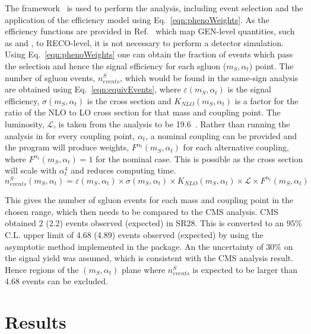 The \MADAN framework~\cite{Conte2013222} is used to perform the analysis, including event selection and the application of the efficiency model using Eq.~\ref{eqn:phenoWeights}. As the efficiency functions are provided in Ref.~\cite{Chatrchyan:2013fea} which map GEN-level quantities, such as \HT and \MET, to RECO-level, it is not necessary to perform a detector simulation.
Using Eq.~\ref{eqn:phenoWeights} one can obtain the fraction of events which pass the selection and hence the signal efficiency for each sgluon ($m_{S},\alpha_{t}$) point. The number of sgluon events, $n^{S}_{events}$, which would be found in the same-sign analysis are obtained using Eq.~\ref{eqn:equivEvents}, where $\varepsilon\left(m_{S},\alpha_{t}\right)$ is the signal efficiency, $\sigma\left(m_{S},\alpha_{t}\right)$ is the cross section and $K_{NLO}\left(m_{S},\alpha_{t}\right)$ is a factor for the ratio of the NLO to LO cross section for that mass and coupling point. The luminosity, $\mathcal{L}$, is taken from the analysis to be 19.6~\fbinv. Rather than running the analysis in \MADAN for every coupling point, $\alpha_{t}$, a nominal coupling can be provided and the program will produce weights, $F^{\alpha_{t}}\left(m_{S},\alpha_{t}\right)$ for each alternative coupling, where $F^{\alpha_{t}}\left(m_{S},\alpha_{t}\right) = 1$ for the nominal case. This is possible as the cross section will scale with $\alpha_{t}^{4}$ and reduces computing time.
\begin{equation}
n^{S}_{events}\left(m_{S},\alpha_{t}\right) = \varepsilon\left(m_{S},\alpha_{t}\right)\times \sigma\left(m_{S},\alpha_{t}\right) \times K_{NLO}\left(m_{S},\alpha_{t}\right) \times \mathcal{L}\times F^{\alpha_{t}}\left(m_{S},\alpha_{t}\right)
\label{eqn:equivEvents}
\end{equation}

This gives the number of sgluon events for each mass and coupling point in the chosen range, which then needs to be compared to the CMS analysis. CMS obtained 2 (2.2) events observed (expected) in SR28. This is converted to an $95\%$ C.L. upper limit of 4.68 (4.89) events observed (expected) by using the asymptotic \CLS method implemented in the \ROOSTAT package. An the uncertainty of $30\%$ on the signal yield was assumed, which is consistent with the CMS analysis result. Hence regions of the $\left(m_{S},\alpha_{t}\right)$ plane where $n^{S}_{events}$ is expected to be larger than 4.68 events can be excluded.


\section{Results \label{sec:sgluonResults}}

